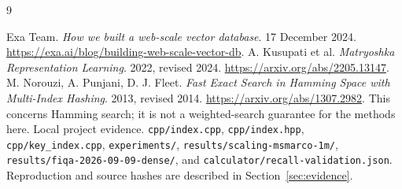 \documentclass[11pt,a4paper]{article}
\begin{document}

\FloatBarrier
{}

\FloatBarrier
{}

\FloatBarrier
{}

\FloatBarrier
{}

\FloatBarrier
{}

\clearpage
\appendix

\begin{thebibliography}{9}\raggedright
{} Exa Team. \emph{How we built a web-scale vector database}. 17 December 2024.
\url{https://exa.ai/blog/building-web-scale-vector-db}.
 A. Kusupati et al. \emph{Matryoshka Representation Learning}. 2022, revised 2024.
\url{https://arxiv.org/abs/2205.13147}.
 M. Norouzi, A. Punjani, D. J. Fleet. \emph{Fast Exact Search in Hamming Space with Multi-Index Hashing}. 2013, revised 2014.
\url{https://arxiv.org/abs/1307.2982}. This concerns Hamming search; it is not a weighted-search guarantee for the methods here.
 Local project evidence. \texttt{cpp/index.cpp}, \texttt{cpp/index.hpp}, \texttt{cpp/key\_index.cpp}, \texttt{experiments/},
\texttt{results/scaling-msmarco-1m/}, \texttt{results/fiqa-2026-09-09-dense/}, and
\texttt{calculator/recall-validation.json}. Reproduction and source hashes are described in Section~\ref{sec:evidence}.
\end{thebibliography}
\end{document}

